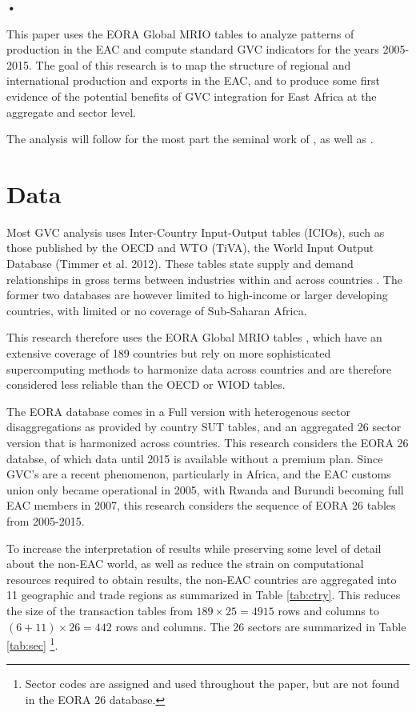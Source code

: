 \textbf{\textbf{•}}\documentclass[a4paper]{article}
\begin{document}
This paper uses the EORA Global MRIO tables \citet{lenzen2012mapping, lenzen2013building} to analyze patterns of production in the EAC and compute standard GVC indicators for the years 2005-2015. The goal of this research is to map the structure of regional and international production and exports in the EAC, and to produce some first evidence of the potential benefits of GVC integration for East Africa at the aggregate and sector level. 

The analysis will follow for the most part the seminal work of \citet{hummels2001nature}, as well as \citet{Kummritz20161,Kummritz20162}. 

\section{Data}
Most GVC analysis uses Inter-Country Input-Output tables (ICIOs), such as those
published by the OECD and WTO (TiVA), the World Input Output Database (Timmer et al. 2012). These tables state supply and demand relationships in gross terms between industries within and across countries \citep{Kummritz2014}. The former two databases are however limited to high-income or larger developing countries, with limited or no coverage of Sub-Saharan Africa. \newline

This research therefore uses the EORA Global MRIO tables \citet{lenzen2012mapping, lenzen2013building}, which have an extensive coverage of 189 countries but rely on more sophisticated supercomputing methods to harmonize data across countries and are therefore considered less reliable than the OECD or WIOD tables. \newline

The EORA database comes in a Full version with heterogenous sector disaggregations as provided by country SUT tables, and an aggregated 26 sector version that is harmonized across countries. This research considers the EORA 26 databse, of which data until 2015 is available without a premium plan. Since GVC's are a recent phenomenon, particularly in Africa, and the EAC customs union only became operational in 2005, with Rwanda and Burundi becoming full EAC members in 2007, this research considers the sequence of EORA 26 tables from 2005-2015. \newline

To increase the interpretation of results while preserving some level of detail about the non-EAC world, as well as reduce the strain on computational resources required to obtain results, the non-EAC countries are aggregated into 11 geographic and trade regions as summarized in Table \ref{tab:ctry}. This reduces the size of the transaction tables from $189 \times 25 = 4915$ rows and columns to $(6 + 11)\times 26 = 442$ rows and columns. The 26 sectors are summarized in Table \ref{tab:sec} \footnote{Sector codes are assigned and used throughout the paper, but are not found in the EORA 26 database.}. \newline
\end{document}
